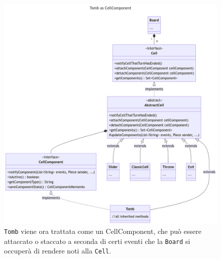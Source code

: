 \documentclass[a4paper,12pt]{report}
\begin{document}
\begin{figure}[H]
	\centering
	\includegraphics[width=\textwidth]{images/tomb-as-cellcomponent.png}
	\caption{\texttt{Tomb} viene ora trattata come un CellComponent, che può essere attaccato o staccato a seconda di certi eventi che la \texttt{Board} si occuperà di rendere noti alla \texttt{Cell}.}
	\label{images:tomb-as-cellcomponent}
\end{figure}
\end{document}
